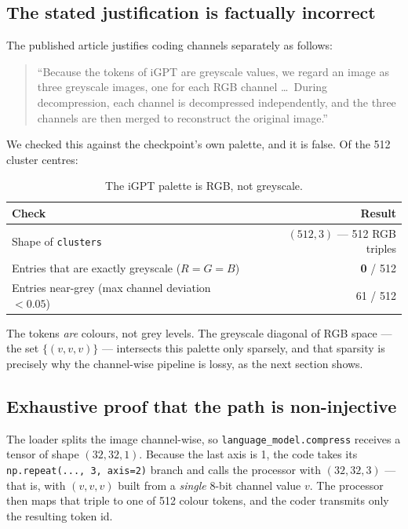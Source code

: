 \documentclass[11pt,a4paper]{article}
\newcommand{\code}[1]{\texttt{\small #1}}
\begin{document}
\subsection{The stated justification is factually incorrect}

The published article justifies coding channels separately as follows:

\begin{quote}
``Because the tokens of iGPT are greyscale values, we regard an image as three
greyscale images, one for each RGB channel \dots\ During decompression, each
channel is decompressed independently, and the three channels are then merged to
reconstruct the original image.''
\end{quote}

We checked this against the checkpoint's own palette, and it is false. Of the 512
cluster centres:

\begin{table}[htbp]
\centering
\small
\caption{The iGPT palette is RGB, not greyscale.}
\label{tab:palette}
\begin{tabular}{lr}
\toprule
Check & Result \\
\midrule
Shape of \code{clusters} & $(512, 3)$ --- 512 RGB triples \\
Entries that are exactly greyscale ($R=G=B$) & \textbf{0} / 512 \\
Entries near-grey (max channel deviation $<0.05$) & 61 / 512 \\
\bottomrule
\end{tabular}
\end{table}

The tokens \emph{are} colours, not grey levels. The greyscale diagonal of RGB
space --- the set $\{(v,v,v)\}$ --- intersects this palette only sparsely, and that
sparsity is precisely why the channel-wise pipeline is lossy, as the next section
shows.

\subsection{Exhaustive proof that the path is non-injective}

The loader splits the image channel-wise, so \code{language\_model.compress}
receives a tensor of shape $(32,32,1)$. Because the last axis is 1, the code takes
its \code{np.repeat(..., 3, axis=2)} branch and calls the processor with
$(32,32,3)$ --- that is, with $(v,v,v)$ built from a \emph{single} 8-bit channel
value $v$. The processor then maps that triple to one of 512 colour tokens, and
the coder transmits only the resulting token id.
\end{document}
